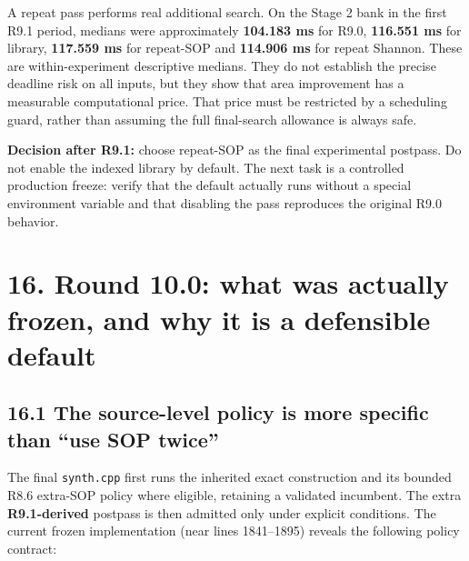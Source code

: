 A repeat pass performs real additional search. On the Stage 2 bank in the first R9.1 period, medians were approximately \textbf{104.183 ms} for R9.0, \textbf{116.551 ms} for library, \textbf{117.559 ms} for repeat-SOP and \textbf{114.906 ms} for repeat Shannon. These are within-experiment descriptive medians. They do not establish the precise deadline risk on all inputs, but they show that area improvement has a measurable computational price. That price must be restricted by a scheduling guard, rather than assuming the full final-search allowance is always safe.

\textbf{Decision after R9.1:} choose repeat-SOP as the final experimental postpass. Do not enable the indexed library by default. The next task is a controlled production freeze: verify that the default actually runs without a special environment variable and that disabling the pass reproduces the original R9.0 behavior.

\section{16. Round 10.0: what was actually frozen, and why it is a defensible default}\label{round-10.0-what-was-actually-frozen-and-why-it-is-a-defensible-default}

\subsection{16.1 The source-level policy is more specific than ``use SOP twice''}\label{the-source-level-policy-is-more-specific-than-use-sop-twice}

The final \texttt{synth.cpp} first runs the inherited exact construction and its bounded R8.6 extra-SOP policy where eligible, retaining a validated incumbent. The extra \textbf{R9.1-derived} postpass is then admitted only under explicit conditions. The current frozen implementation (near lines 1841--1895) reveals the following policy contract:

